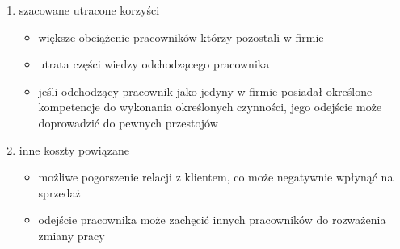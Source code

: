 \begin{enumerate}
    \item szacowane utracone korzyści
    \begin{itemize}
        \item większe obciążenie pracowników którzy pozostali w firmie
        \item utrata części wiedzy odchodzącego pracownika
        \item jeśli odchodzący pracownik jako jedyny w firmie posiadał określone kompetencje do wykonania określonych czynności, jego odejście może doprowadzić do pewnych przestojów
    \end{itemize}
    \item inne koszty powiązane
    \begin{itemize}
        \item możliwe pogorszenie relacji z klientem, co może negatywnie wpłynąć na sprzedaż
        \item odejście pracownika może zachęcić innych pracowników do rozważenia zmiany pracy
    \end{itemize}
\end{enumerate}
\thispagestyle{normal}
